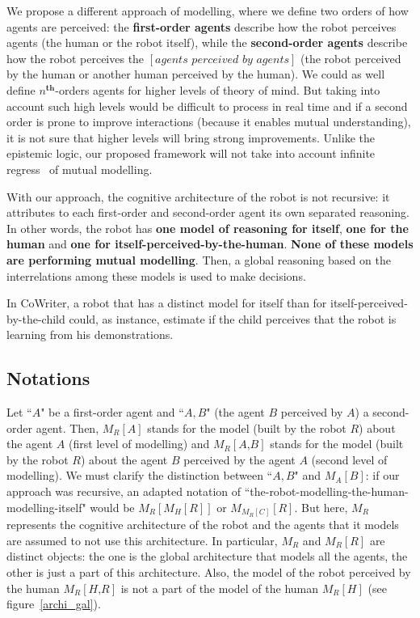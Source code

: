\documentclass[10pt,a4paper]{article}
\begin{document}
We propose a different approach of modelling, where we define two orders of how agents are perceived: the \textbf{first-order agents} describe how the robot perceives agents (the human or the robot itself), while the \textbf{second-order agents} describe how the robot perceives the $\left[\textit{agents perceived by agents}\right]$ (the robot perceived by the human or another human perceived by the human). We could as well define $\textit{n}^{\textbf{th}}$-orders agents for higher levels of theory of mind. But taking into account such high levels would be difficult to process in real time and if a second order is prone to improve interactions (because it enables mutual understanding), it is not sure that higher levels will bring strong improvements. Unlike the epistemic logic, our proposed framework will not take into account infinite regress~\cite{clark1991grounding} of mutual modelling.

With our approach, the cognitive architecture of the robot is not recursive: it attributes to each first-order and second-order agent its own separated reasoning. In other words, the robot has \textbf{one model of reasoning for itself}, \textbf{one for the human} and \textbf{one for itself-perceived-by-the-human}. \textbf{None of these models are performing mutual modelling}. Then, a global reasoning based on the interrelations among these models is used to make decisions.

In CoWriter, a robot that has a distinct model for itself than for itself-perceived-by-the-child could, as instance, estimate if the child perceives that the robot is learning from his demonstrations. 



\subsection{Notations}\label{not}
Let ``$A$" be a first-order agent and ``$A,B$" (the agent $B$ perceived by $A$) a second-order agent. Then, $M_R\left[\textit{A}\right]$ stands for \textcolor{wine}{the model (built by the robot $R$) about the agent $A$} (first level of modelling) and $M_R\left[\textit{A,B}\right]$ stands for \textcolor{wine}{the model (built by the robot $R$) about the agent $B$ perceived by the agent $A$} (second level of modelling). We must clarify the distinction between ``$A,B$" and $M_A\left[\textit{B}\right]$: if our approach was recursive, an adapted notation of ``the-robot-modelling-the-human-modelling-itself" would be $M_R\left[M_H\left[\textit{R}\right]\right]$ or $M_{M_R\left[C\right]}\left[\textit{R}\right]$. But here, $M_R$ represents the cognitive architecture of the robot and  the agents that it models are assumed to not use this architecture. In particular, $M_R$ and $M_R\left[R\right]$ are distinct objects: the one is the global architecture that models all the agents, the other is just a part of this architecture. Also, the model of the robot perceived by the human $M_R\left[\textit{H,R}\right]$ is not a part of the model of the human $M_R\left[\textit{H}\right]$ (see figure~\ref{archi_gal}).
\end{document}
